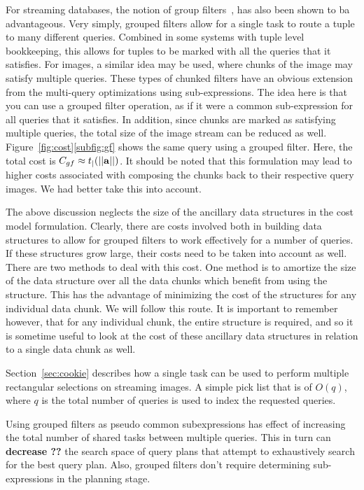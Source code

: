 \documentclass{vldb}
\begin{document}
For streaming databases, the notion of group filters~\cite{madden},
has also been shown to ba advantageous.  Very simply, grouped filters
allow for a single task to route a tuple to many different queries.
Combined in some systems with tuple level bookkeeping, this allows for
tuples to be marked with all the queries that it satisfies.  For
images, a similar idea may be used, where chunks of the image may
satisfy multiple queries.  These types of chunked filters have an
obvious extension from the multi-query optimizations using
sub-expressions.  The idea here is that you can use a grouped filter
operation, as if it were a common sub-expression for all queries that
it satisfies.  In addition, since chunks are marked as satisfying
multiple queries, the total size of the image stream can be reduced as
well.  Figure~\ref{fig:cost}\ref{subfig:gf} shows the same query using
a grouped filter.  Here, the total cost is $C_{gf} \approx t_{|}(||{\bf{a}}||)$.
It should be noted that this formulation may lead to higher costs
associated with composing the chunks back to their respective query
images.  We had better take this into account.

The above discussion neglects the size of the ancillary data
structures in the cost model formulation.  Clearly, there are costs
involved both in building data structures to allow for grouped filters
to work effectively for a number of queries.  If these structures grow
large, their costs need to be taken into account as well.  There are
two methods to deal with this cost.  One method is to amortize the
size of the data structure over all the data chunks which benefit from
using the structure.  This has the advantage of minimizing the cost of
the structures for any individual data chunk.  We will follow this
route.  It is important to remember however, that for any individual
chunk, the entire structure is required, and so it is sometime useful
to look at the cost of these ancillary data structures in relation to
a single data chunk as well.

Section~\ref{sec:cookie} describes how a single task can be used to
perform multiple rectangular selections on streaming images.  A simple
pick list that is of $O(q)$, where $q$ is the total number of queries
is used to index the requested queries.

Using grouped filters as pseudo common subexpressions has effect of
increasing the total number of shared tasks between multiple queries.
This in turn can {\bf decrease ??} the search space of query plans
that attempt to exhaustively search for the best query plan.  Also,
grouped filters don't require determining sub-expressions in the
planning stage.
\end{document}
